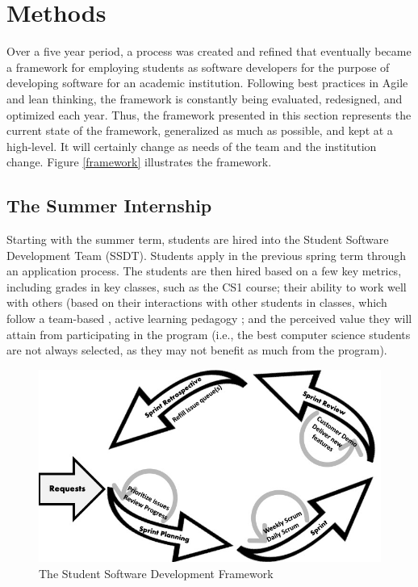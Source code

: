 \section{Methods}
Over a five year period, a process was created and refined that eventually became a framework for employing students as software developers for the purpose of developing software for an academic institution. Following best practices in Agile and lean thinking, the framework is constantly being evaluated, redesigned, and optimized each year. Thus, the framework presented in this section represents the current state of the framework, generalized as much as possible, and kept at a high-level. It will certainly change as needs of the team and the institution change. Figure \ref{framework} illustrates the framework. 

\subsection{The Summer Internship}
Starting with the summer term, students are hired into the Student Software Development Team (SSDT). Students apply in the previous spring term through an application process. The students are then hired based on a few key metrics, including grades in key classes, such as the CS1 course; their ability to work well with others (based on their interactions with other students in classes, which follow a team-based \cite{2002PairProgramming}, active learning pedagogy \cite{2012Pogil}; and the perceived value they will attain from participating in the program (i.e., the best computer science students are not always selected, as they may not benefit as much from the program). 

\begin{figure}[h]
  \centering
  \includegraphics[width=\linewidth]{developmentcycle3.jpg}
  \caption{The Student Software Development Framework}
\end{figure}

